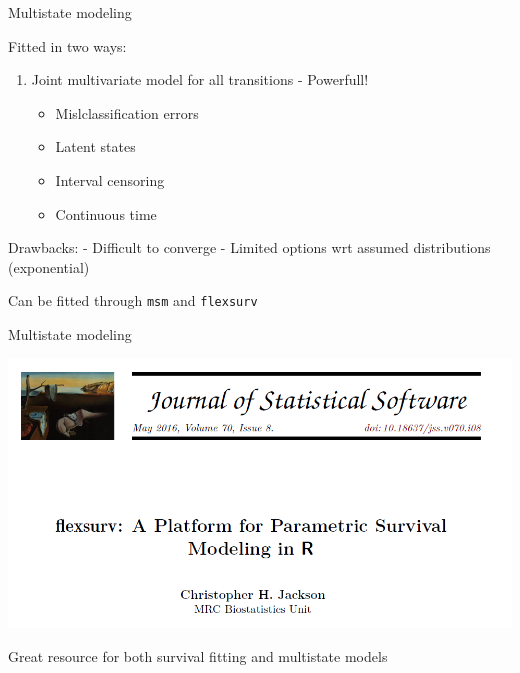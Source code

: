 \documentclass[ignorenonframetext,]{beamer}
\providecommand{\tightlist}{%
  \setlength{\itemsep}{0pt}\setlength{\parskip}{0pt}}
\begin{document}
\begin{frame}[fragile]{Multistate modeling}

Fitted in two ways:

\begin{enumerate}
\def\labelenumi{\arabic{enumi}.}
\setcounter{enumi}{1}
\tightlist
\item
  Joint multivariate model for all transitions - Powerfull!

  \begin{itemize}
  \tightlist
  \item
    Mislclassification errors
  \item
    Latent states
  \item
    Interval censoring
  \item
    Continuous time
  \end{itemize}
\end{enumerate}

Drawbacks: - Difficult to converge - Limited options wrt assumed
distributions (exponential)

Can be fitted through \texttt{msm} and \texttt{flexsurv}

\end{frame}

\begin{frame}{Multistate modeling}

\includegraphics[width=1\linewidth]{figures/jacksonflex}

Great resource for both survival fitting and multistate models

\end{frame}
\end{document}
